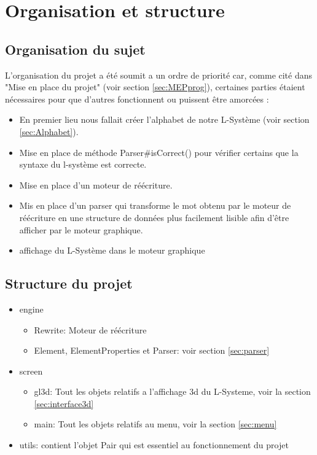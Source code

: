 \chapter{Organisation et structure}

\section{Organisation du sujet}
L'organisation du projet a été soumit a un ordre de priorité car, comme cité dans "Mise en place du projet" (voir section \ref{sec:MEPprog}), certaines parties étaient nécessaires pour que d'autres fonctionnent ou puissent être amorcées :
\begin{itemize}
    \item En premier lieu nous fallait créer l'alphabet de notre L-Système (voir section \ref{sec:Alphabet}).
    \item Mise en place de méthode Parser\#isCorrect() pour vérifier certains que la syntaxe du l-système est correcte.
    \item Mise en place d'un moteur de réécriture.
    \item Mis en place d'un parser qui transforme le mot obtenu par le moteur de réécriture en une structure de données plus facilement lisible afin d'être afficher par le moteur graphique.
    \item affichage du L-Système dans le moteur graphique
\end{itemize}

\section{Structure du projet}
\begin{itemize}
    \item engine
    \begin{itemize}
        \item Rewrite: Moteur de réécriture
        \item Element, ElementProperties et Parser: voir section \ref{sec:parser}
    \end{itemize}
    \item screen
    \begin{itemize}
        \item gl3d: Tout les objets relatifs a l'affichage 3d du L-Systeme, voir la section \ref{sec:interface3d}
        \item main: Tout les objets relatifs au menu, voir la section \ref{sec:menu}
    \end{itemize}
    \item utils: contient l'objet Pair qui est essentiel au fonctionnement du projet
\end{itemize}

